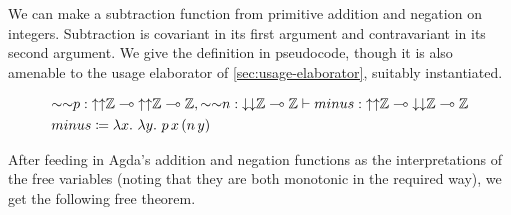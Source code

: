 \begin{example}\label{thm:minus}
  We can make a subtraction function from primitive addition and negation on
  integers.
  Subtraction is covariant in its first argument and contravariant in its
  second argument.
  We give the definition in pseudocode, though it is also amenable to the
  usage elaborator of \cref{sec:usage-elaborator}, suitably instantiated.

  \begin{align*}
    &{\sim\sim}p :
      {\uparrow\uparrow}\mathbb Z \multimap
      {\uparrow\uparrow}\mathbb Z \multimap \mathbb Z,
      {\sim\sim}n : {\downarrow\downarrow}\mathbb Z \multimap \mathbb Z
      \vdash \mathnormal{minus} :
      {\uparrow\uparrow}\mathbb Z \multimap
      {\downarrow\downarrow}\mathbb Z \multimap
      \mathbb Z
    \\
    &\mathnormal{minus} \coloneqq \lambda x.~\lambda y.~p\,x\,(n\,y)
  \end{align*}

  After feeding in Agda's addition and negation functions as the
  interpretations of the free variables (noting that they are both monotonic
  in the required way), we get the following free theorem.





\end{example}
